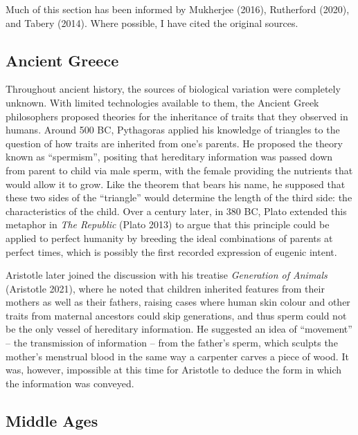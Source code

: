 \documentclass[
]{book}
\begin{document}
Much of this section has been informed by Mukherjee (2016), Rutherford (2020), and Tabery (2014). Where possible, I have cited the original sources.

\hypertarget{ancient-greece}{%
\subsection{Ancient Greece}\label{ancient-greece}}

Throughout ancient history, the sources of biological variation were completely unknown. With limited technologies available to them, the Ancient Greek philosophers proposed theories for the inheritance of traits that they observed in humans. Around 500 BC, Pythagoras applied his knowledge of triangles to the question of how traits are inherited from one's parents. He proposed the theory known as ``spermism'', positing that hereditary information was passed down from parent to child via male sperm, with the female providing the nutrients that would allow it to grow. Like the theorem that bears his name, he supposed that these two sides of the ``triangle'' would determine the length of the third side: the characteristics of the child. Over a century later, in 380 BC, Plato extended this metaphor in \emph{The Republic} (Plato 2013) to argue that this principle could be applied to perfect humanity by breeding the ideal combinations of parents at perfect times, which is possibly the first recorded expression of eugenic intent.

Aristotle later joined the discussion with his treatise \emph{Generation of Animals} (Aristotle 2021), where he noted that children inherited features from their mothers as well as their fathers, raising cases where human skin colour and other traits from maternal ancestors could skip generations, and thus sperm could not be the only vessel of hereditary information. He suggested an idea of ``movement'' -- the transmission of information -- from the father's sperm, which sculpts the mother's menstrual blood in the same way a carpenter carves a piece of wood. It was, however, impossible at this time for Aristotle to deduce the form in which the information was conveyed.

\hypertarget{middle-ages}{%
\subsection{Middle Ages}\label{middle-ages}}
\end{document}
